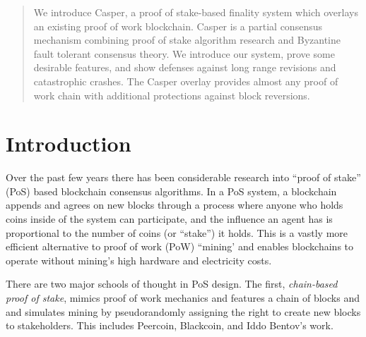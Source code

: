 \documentclass[12pt]{article}
\begin{document}
\maketitle
\TODO{\vspace{-0.2in} \today\ \ \currenttime}


\begin{abstract}
We introduce Casper, a proof of stake-based finality system which overlays an existing proof of work blockchain. Casper is a partial consensus mechanism combining proof of stake algorithm research and Byzantine fault tolerant consensus theory.  We introduce our system, prove some desirable features, and show defenses against long range revisions and catastrophic crashes.  The Casper overlay provides almost any proof of work chain with additional protections against block reversions.
\end{abstract}

\section{Introduction}
\label{sect:intro}

Over the past few years there has been considerable research into ``proof of stake'' (PoS) based blockchain consensus algorithms. In a PoS system, a blockchain appends and agrees on new blocks through a process where anyone who holds coins inside of the system can participate, and the influence an agent has is proportional to the number of coins (or ``stake'') it holds. This is a vastly more efficient alternative to proof of work (PoW) ``mining' and enables blockchains to operate without mining's high hardware and electricity costs.

There are two major schools of thought in PoS design. The first, \textit{chain-based proof of stake}, mimics proof of work mechanics and features a chain of blocks and and simulates mining by pseudorandomly assigning the right to create new blocks to stakeholders.  This includes Peercoin\cite{king2012ppcoin}, Blackcoin\cite{vasin2014blackcoin}, and Iddo Bentov's work\cite{bentov2016pos}.
\end{document}
